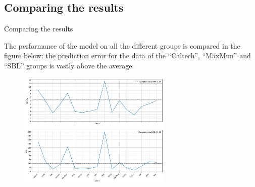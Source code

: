\documentclass{beamer}
\begin{document}
\subsection{Comparing the results}
\begin{frame}{Comparing the results}

The performance of the model on all the different groups is compared in the figure below: the prediction error for the data of the ``Caltech'', ``MaxMun'' and ``SBL'' groups is vastly above the average. 

\begin{figure}
	\includegraphics[width=0.65\textwidth]{result_1.png}
	\label{plotRMSComparison2}
\end{figure}

\end{frame}
\end{document}

